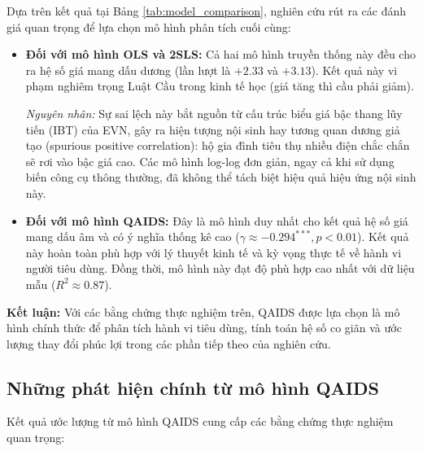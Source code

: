 \documentclass[12pt,a4paper,oneside]{article}
\begin{document}
	Dựa trên kết quả tại Bảng \ref{tab:model_comparison}, nghiên cứu rút ra các đánh giá quan trọng để lựa chọn mô hình phân tích cuối cùng:
	
	\begin{itemize}
		\item \textbf{Đối với mô hình OLS và 2SLS:} Cả hai mô hình truyền thống này đều cho ra hệ số giá mang dấu dương (lần lượt là $+2.33$ và $+3.13$). Kết quả này vi phạm nghiêm trọng Luật Cầu trong kinh tế học (giá tăng thì cầu phải giảm). 
		
		\textit{Nguyên nhân:} Sự sai lệch này bắt nguồn từ cấu trúc biểu giá bậc thang lũy tiến (IBT) của EVN, gây ra hiện tượng nội sinh hay tương quan dương giả tạo (spurious positive correlation): hộ gia đình tiêu thụ nhiều điện chắc chắn sẽ rơi vào bậc giá cao. Các mô hình log-log đơn giản, ngay cả khi sử dụng biến công cụ thông thường, đã không thể tách biệt hiệu quả hiệu ứng nội sinh này.
		
		\item \textbf{Đối với mô hình QAIDS:} Đây là mô hình duy nhất cho kết quả hệ số giá mang dấu âm và có ý nghĩa thống kê cao ($\gamma \approx -0.294^{***}, p<0.01$). Kết quả này hoàn toàn phù hợp với lý thuyết kinh tế và kỳ vọng thực tế về hành vi người tiêu dùng. Đồng thời, mô hình này đạt độ phù hợp cao nhất với dữ liệu mẫu ($R^2 \approx 0.87$).
	\end{itemize}
	
	\textbf{Kết luận:} Với các bằng chứng thực nghiệm trên, QAIDS được lựa chọn là mô hình chính thức để phân tích hành vi tiêu dùng, tính toán hệ số co giãn và ước lượng thay đổi phúc lợi trong các phần tiếp theo của nghiên cứu.
	
	\subsection{Những phát hiện chính từ mô hình QAIDS}
	
	Kết quả ước lượng từ mô hình QAIDS cung cấp các bằng chứng thực nghiệm quan trọng:
	
\end{document}
